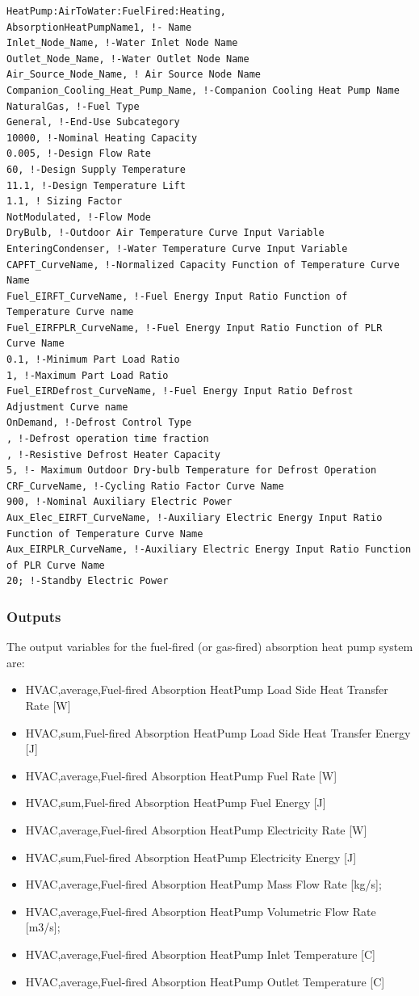 \begin{lstlisting}
HeatPump:AirToWater:FuelFired:Heating,
AbsorptionHeatPumpName1, !- Name
Inlet_Node_Name, !-Water Inlet Node Name
Outlet_Node_Name, !-Water Outlet Node Name
Air_Source_Node_Name, ! Air Source Node Name
Companion_Cooling_Heat_Pump_Name, !-Companion Cooling Heat Pump Name
NaturalGas, !-Fuel Type
General, !-End-Use Subcategory
10000, !-Nominal Heating Capacity
0.005, !-Design Flow Rate
60, !-Design Supply Temperature
11.1, !-Design Temperature Lift
1.1, ! Sizing Factor
NotModulated, !-Flow Mode
DryBulb, !-Outdoor Air Temperature Curve Input Variable
EnteringCondenser, !-Water Temperature Curve Input Variable
CAPFT_CurveName, !-Normalized Capacity Function of Temperature Curve Name
Fuel_EIRFT_CurveName, !-Fuel Energy Input Ratio Function of Temperature Curve name
Fuel_EIRFPLR_CurveName, !-Fuel Energy Input Ratio Function of PLR Curve Name
0.1, !-Minimum Part Load Ratio
1, !-Maximum Part Load Ratio
Fuel_EIRDefrost_CurveName, !-Fuel Energy Input Ratio Defrost Adjustment Curve name
OnDemand, !-Defrost Control Type
, !-Defrost operation time fraction
, !-Resistive Defrost Heater Capacity
5, !- Maximum Outdoor Dry-bulb Temperature for Defrost Operation
CRF_CurveName, !-Cycling Ratio Factor Curve Name
900, !-Nominal Auxiliary Electric Power
Aux_Elec_EIRFT_CurveName, !-Auxiliary Electric Energy Input Ratio Function of Temperature Curve Name
Aux_EIRPLR_CurveName, !-Auxiliary Electric Energy Input Ratio Function of PLR Curve Name
20; !-Standby Electric Power
\end{lstlisting}

\subsubsection{Outputs}

The output variables for the fuel-fired (or gas-fired) absorption heat pump system are: 

\begin{itemize}
\item HVAC,average,Fuel-fired Absorption HeatPump Load Side Heat Transfer Rate [W]
\item HVAC,sum,Fuel-fired Absorption HeatPump Load Side Heat Transfer Energy [J]
\item HVAC,average,Fuel-fired Absorption HeatPump Fuel Rate [W]
\item HVAC,sum,Fuel-fired Absorption HeatPump Fuel Energy [J]
\item HVAC,average,Fuel-fired Absorption HeatPump Electricity Rate [W]
\item HVAC,sum,Fuel-fired Absorption HeatPump Electricity Energy [J]
\item HVAC,average,Fuel-fired Absorption HeatPump Mass Flow Rate [kg/s];
\item HVAC,average,Fuel-fired Absorption HeatPump Volumetric Flow Rate [m3/s];
\item HVAC,average,Fuel-fired Absorption HeatPump Inlet Temperature [C]
\item HVAC,average,Fuel-fired Absorption HeatPump Outlet Temperature [C]
\end{itemize}

